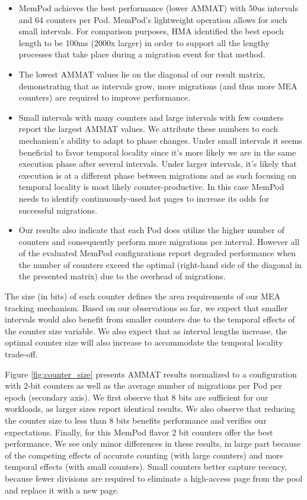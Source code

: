 \begin{itemize}
\setlength\itemsep{0em}
	\item MemPod achieves the best performance (lower AMMAT) with 50us intervals and 64 counters per Pod. MemPod's lightweight operation allows for such small intervals. For comparison purposes, HMA \cite{meswani-HPCA21} identified the best epoch length to be 100ms (2000x larger) in order to support all the lengthy processes that take place during a migration event for that method.
	\item The lowest AMMAT values lie on the diagonal of our result matrix, demonstrating that as intervals grow, more migrations (and thus more MEA counters) are required to improve performance.
	\item Small intervals with many counters and large intervals with few counters report the largest AMMAT values. We attribute these numbers to each mechanism's ability to adapt to phase changes. Under small intervals it seems beneficial to favor temporal locality since it's more likely we are in the same execution phase after several intervals. Under larger intervals, it's likely that execution is at a different phase between migrations and as such focusing on temporal locality is most likely counter-productive. In this case MemPod needs to identify continuously-used hot pages to increase its odds for successful migrations.
	\item Our results also indicate that each Pod does utilize the higher number of counters and consequently perform more migrations per interval. However all of the evaluated MemPod configurations report degraded performance when the number of counters exceed the optimal (right-hand side of the diagonal in the presented matrix) due to the overhead of migrations. 
\end{itemize}

The size (in bits) of each counter defines the area requirements of our MEA tracking mechanism. Based on our observations so far, we expect that smaller intervals would also benefit from smaller counters due to the temporal effects of the counter size variable. We also expect that as interval lengths increase, the optimal counter size will also increase to accommodate the temporal locality trade-off. 

Figure \ref{fig:counter_size} presents AMMAT results normalized to a configuration with 2-bit counters as well as the average number of migrations per Pod per epoch (secondary axis). We first observe that 8 bits are sufficient for our workloads, as larger sizes report identical results. We also observe that reducing the counter size to less than 8 bits benefits performance and verifies our expectations. Finally, for this MemPod flavor 2 bit counters offer the best performance. We see only minor differences in these results,
in large part because of the competing effects of accurate counting (with large counters) and more temporal effects (with small counters). Small counters better capture recency, because fewer divisions are required   to eliminate a high-access page from the pool and
replace it with a new page.


